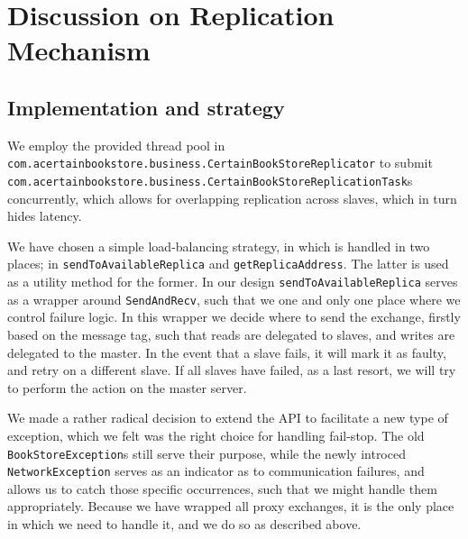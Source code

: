 
\section{Discussion on Replication Mechanism}

\subsection{Implementation and strategy}
We employ the provided thread pool in
{\tt com.acertainbookstore.business.CertainBookStoreReplicator} to submit
{\tt com.acertainbookstore.business.CertainBookStoreReplicationTask}s concurrently,
which allows for overlapping replication across slaves, which in turn hides
latency.

We have chosen a simple load-balancing strategy, in which is handled in two
places; in {\tt sendToAvailableReplica} and {\tt getReplicaAddress}. The latter
is used as a utility method for the former. In our design
{\tt sendToAvailableReplica} serves as a wrapper around {\tt SendAndRecv}, such
that we one and only one place where we control failure logic. In this wrapper
we decide where to send the exchange, firstly based on the message tag, such
that reads are delegated to slaves, and writes are delegated to the master. In
the event that a slave fails, it will mark it as faulty, and retry on a different
slave. If all slaves have failed, as a last resort, we will try to perform the
action on the master server.

We made a rather radical decision to extend the API to facilitate a new type of
exception, which we felt was the right choice for handling fail-stop. The old
{\tt BookStoreException}s still serve their purpose, while the newly introced
{\tt NetworkException} serves as an indicator as to communication failures, and
allows us to catch those specific occurrences, such that we might handle them
appropriately. Because we have wrapped all proxy exchanges, it is the only
place in which we need to handle it, and we do so as described above.

